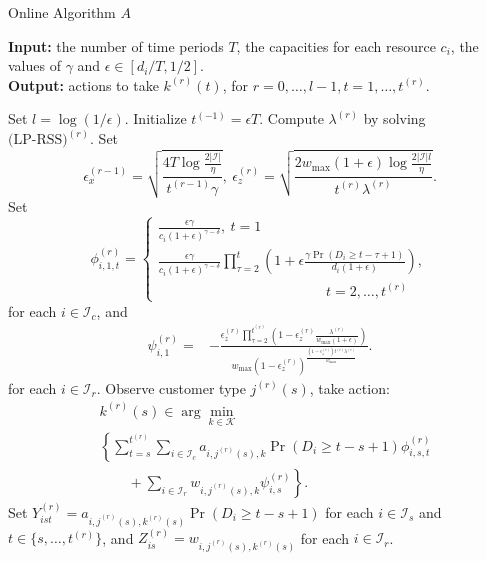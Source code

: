 \documentclass[letterpaper, 10 pt, conference]{ieeeconf}  %
\newcommand{\III}{\mathcal{I}}
\newcommand{\KKK}{\mathcal{K}}
\theoremstyle{plain}
\theoremstyle{definition}
\theoremstyle{remark}
\begin{document}
\begin{algorithm}[]
\caption{Online Algorithm $A$}\label{alg:one}
\textbf{Input:} the number of time periods $T$, the capacities for each resource $c_i$, the values of $\gamma$ and $\epsilon \in \left[d_i/T, 1/2\right]$. \\
\textbf{Output:} actions to take $k^{(r)}(t)$, for $r=0,\ldots,l-1, t=1,\dots,t^{(r)}$.
\begin{algorithmic}[1]
\State Set $l=\log\left(1/\epsilon\right)$.
Initialize $t^{(-1)}=\epsilon T$.
\State Compute $\lambda^{(r)}$ by solving $\text{(LP-RSS)}^{(r)}$. \label{oalg:step_1}
\State \label{oalg:step_2_start} Set $$\epsilon^{(r-1)}_{x} = \sqrt{\frac{4 T \log\frac{2 |\III|}{\eta}}{t^{(r-1)} \gamma}},~ \epsilon^{(r)}_{z}=\sqrt{\frac{2w_{\max} (1+\epsilon) \log\frac{2|\III|l}{\eta}}{t^{(r)} \lambda^{(r)}}}.$$
\State Set 
\[
\phi^{(r)}_{i,1,t}= 
\begin{cases}
\frac{\epsilon \gamma}{c_i (1+\epsilon)^{\gamma-\delta}},  ~t=1 \\
\frac{\epsilon \gamma}{c_i (1+\epsilon)^{\gamma-\delta}} \prod^{t}_{\tau=2} \left(1+\epsilon {\frac{\gamma \Pr\left(D_i \geq t-\tau+1\right)}{d_i (1+\epsilon)}}\right),  \\ \quad \quad \quad \quad \quad \quad \quad \quad \quad \quad \quad \quad t=2,\ldots,t^{(r)}
\end{cases}
\]
for each $i\in \III_c$, and
\begin{align}
\psi^{(r)}_{i,1}=& -\frac{\epsilon^{(r)}_{z} \prod^{t^{(r)}}_{\tau=2} \left(1-\epsilon^{(r)}_{z} \frac{\lambda^{(r)}}{w_{\max} (1+\epsilon)}\right)}{w_{\max} \left(1-\epsilon^{(r)}_{z}\right)^{\frac{\left(1-\epsilon^{(r)}_{z}\right) t^{(r)} \lambda^{(r)}}{w_{\max}}}}.  \nonumber
\end{align}
for each $i\in \III_r$.
\State \label{oalg:k} Observe customer type $j^{(r)}(s)$, take action:
\begin{align}
& k^{(r)}(s) \in \arg \min \limits_{k \in \KKK} \nonumber \\
& \left\{\sum^{t^{(r)}}_{t=s} \sum_{i \in \III_c} a_{i,j^{(r)}(s),k} \Pr\left(D_i \geq t-s+1\right) \phi^{(r)}_{i,s,t} \right. \nonumber \\
& \qquad + \left. \sum_{i \in \III_r} w_{i,j^{(r)}(s),k} \psi^{(r)}_{i,s}\right\}. \nonumber
\end{align}
\State Set $Y^{(r)}_{ist}=a_{i,j^{(r)}(s),k^{(r)}(s)} \Pr\left(D_i \geq t-s+1\right)$ for each $i\in \III_s$ and $t\in \{s, \ldots, t^{(r)}\}$, and $Z^{(r)}_{is}=w_{i,j^{(r)}(s),k^{(r)}(s)}$ for each $i\in \III_r$.

\end{algorithmic}
\end{algorithm}
\end{document}

